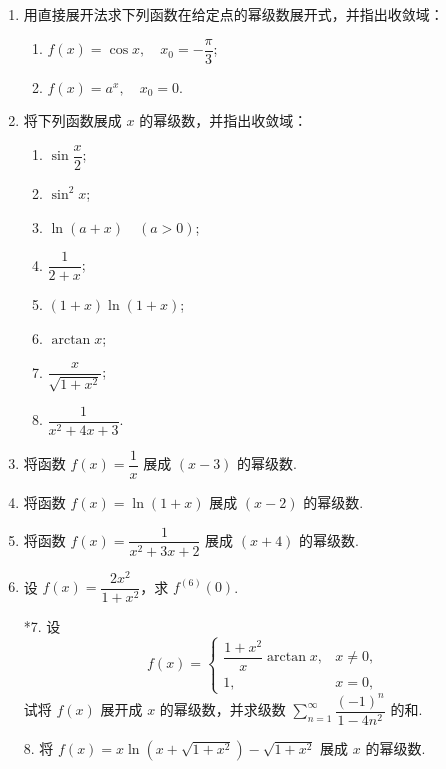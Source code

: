 \begin{enumerate}\setlength{\itemsep}{7pt}
    \item 用直接展开法求下列函数在给定点的幂级数展开式，并指出收敛域：
    \begin{enumerate}[(1)]\setlength{\itemsep}{10pt}\setlength{\topsep}{15pt}
        \item $f(x)=\cos x,\quad x_0=-\dfrac{\pi}{3}$;
        \item $f(x)=a^x,\quad x_0=0$.
    \end{enumerate}

    \item 将下列函数展成 $x$ 的幂级数，并指出收敛域：
    \begin{enumerate}[(1)]\setlength{\itemsep}{10pt}\setlength{\topsep}{15pt}
        \item $\sin \dfrac{x}{2}$;
        \item $\sin^2x$;
        \item $\ln(a+x)\quad(a>0)$;
        \item $\dfrac{1}{2+x}$;
        \item $(1+x)\ln(1+x)$;
        \item $\arctan x$;
        \item $\dfrac{x}{\sqrt{1+x^2}}$;
        \item $\dfrac{1}{x^2+4x+3}$.
    \end{enumerate}

    \item 将函数 $f(x)=\dfrac{1}{x}$ 展成 $(x-3)$ 的幂级数.
    
    \item 将函数 $f(x)=\ln(1+x)$ 展成 $(x-2)$ 的幂级数.
    
    \item 将函数 $f(x)=\dfrac{1}{x^2+3x+2}$ 展成 $(x+4)$ 的幂级数.
    
    \item 设 $f(x)=\dfrac{2x^2}{1+x^2}$，求 $f^{(6)}(0)$.
    
    \item[*7.] 设
    \[
        f(x)=
        \begin{cases}
            \dfrac{1+x^2}{x}\arctan x,&x\not=0,\\
            1,&x=0,   
        \end{cases}
    \]
    试将 $f(x)$ 展开成 $x$ 的幂级数，并求级数 $\displaystyle \sum_{n=1}^{\infty}\dfrac{(-1)^n}{1-4n^2}$ 的和.
    
    \item[8.] 将 $f(x)=x\ln(x+\sqrt{1+x^2})-\sqrt{1+x^2}$ 展成 $x$ 的幂级数.
\end{enumerate}

